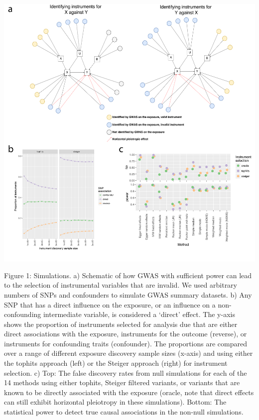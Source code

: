 \documentclass[]{article}
\begin{document}
\newpage

\includegraphics{images/fig1.pdf}

Figure 1: Simulations. a) Schematic of how GWAS with sufficient power
can lead to the selection of instrumental variables that are invalid. We
used arbitrary numbers of SNPs and confounders to simulate GWAS summary
datasets. b) Any SNP that has a direct influence on the exposure, or an
influence on a non-confounding intermediate variable, is considered a
`direct' effect. The y-axis shows the proportion of instruments selected
for analysis due that are either direct associations with the exposure,
instruments for the outcome (reverse), or instruments for confounding
traits (confounder). The proportions are compared over a range of
different exposure discovery sample sizes (x-axis) and using either the
tophits approach (left) or the Steiger approach (right) for instrument
selection. c) Top: The false discovery rates from null simulations for
each of the 14 methods using either tophits, Steiger filtered variants,
or variants that are known to be directly associated with the exposure
(oracle, note that direct effects can still exhibit horizontal
pleiotropy in these simulations). Bottom: The statistical power to
detect true causal associations in the non-null simulations.

\newpage
\end{document}
